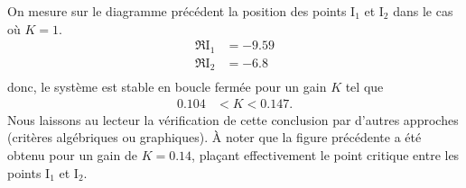 On mesure sur le diagramme précédent la position des points I$_1$ et I$_2$ 
dans le cas où $K=1$.
\begin{align*}
    \Re{\mathrm{I}_1}&=-9.59\\
    \Re{\mathrm{I}_2}&=-6.8\\
\end{align*}
donc, le système est stable en boucle fermée pour un gain $K$ tel que
\begin{align*}
    0.104&<K<0.147.
\end{align*}
Nous laissons au lecteur la vérification de cette conclusion par d'autres 
approches (critères algébriques ou graphiques).
À noter que la figure précédente a été obtenu pour un gain de $K=0.14$, plaçant
effectivement le point critique entre les points I$_1$ et I$_2$.
